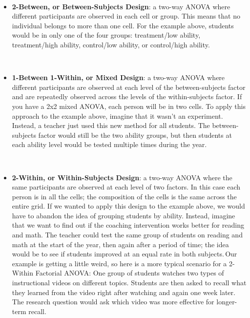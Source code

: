 \documentclass[
  letterpaper,
  DIV=11,
  numbers=noendperiod]{scrreprt}
\providecommand{\tightlist}{%
  \setlength{\itemsep}{0pt}\setlength{\parskip}{0pt}}
\begin{document}
\,

\begin{itemize}
\tightlist
\item
  \textbf{2-Between, or Between-Subjects Design}: a two-way ANOVA where
  different participants are observed in each cell or group. This means
  that no individual belongs to more than one cell. For the example
  above, students would be in only one of the four groups: treatment/low
  ability, treatment/high ability, control/low ability, or control/high
  ability.\,\,
\end{itemize}

\,

\begin{itemize}
\tightlist
\item
  \textbf{1-Between 1-Within, or Mixed Design}: a two-way ANOVA where
  different participants are observed at each level of the
  between-subjects factor and are repeatedly observed across the levels
  of the within-subjects factor. If you have a 2x2 mixed ANOVA, each
  person will be in two cells. To apply this approach to the example
  above, imagine that it wasn't an experiment. Instead, a teacher just
  used this new method for all students. The between-subjects factor
  would still be the two ability groups, but then students at each
  ability level would be tested multiple times during the year.\,\,
\end{itemize}

\,

\begin{itemize}
\tightlist
\item
  \textbf{2-Within, or Within-Subjects Design}: a two-way ANOVA where
  the same participants are observed at each level of two factors. In
  this case each person is in all the cells; the composition of the
  cells is the same across the entire grid. If we wanted to apply this
  design to the example above, we would have to abandon the idea of
  grouping students by ability. Instead, imagine that we want to find
  out if the coaching intervention works better for reading and math.
  The teacher could test the same group of students on reading and math
  at the start of the year, then again after a period of time; the idea
  would be to see if students improved at an equal rate in both
  subjects.\,Our example is getting a little weird, so here is a more
  typical scenario for a 2-Within Factorial ANOVA: One group of students
  watches two types of instructional videos on different topics.
  Students are then asked to recall what they learned from the video
  right after watching and again one week later. The research question
  would ask which video was more effective for longer-term recall.\,\,
  \,
\end{itemize}
\end{document}
